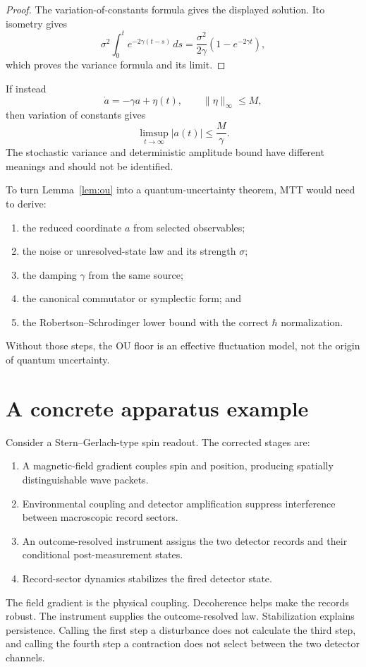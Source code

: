 \documentclass[11pt,a4paper]{article}
\theoremstyle{definition}
\theoremstyle{remark}
\begin{document}
\begin{proof}
The variation-of-constants formula gives the displayed solution. Ito isometry
gives
\[
\sigma^2\int_0^t e^{-2\gamma(t-s)}\,ds
=\frac{\sigma^2}{2\gamma}(1-e^{-2\gamma t}),
\]
which proves the variance formula and its limit.
\end{proof}

If instead
\[
\dot a=-\gamma a+\eta(t),
\qquad
\|\eta\|_\infty\leq M,
\]
then variation of constants gives
\[
\limsup_{t\to\infty}|a(t)|\leq\frac{M}{\gamma}.
\]
The stochastic variance and deterministic amplitude bound have different
meanings and should not be identified.

To turn Lemma~\ref{lem:ou} into a quantum-uncertainty theorem, MTT would need
to derive:
\begin{enumerate}
\item the reduced coordinate \(a\) from selected observables;
\item the noise or unresolved-state law and its strength \(\sigma\);
\item the damping \(\gamma\) from the same source;
\item the canonical commutator or symplectic form; and
\item the Robertson--Schrodinger lower bound with the correct \(\hbar\)
normalization.
\end{enumerate}
Without those steps, the OU floor is an effective fluctuation model, not the
origin of quantum uncertainty.

\section{A concrete apparatus example}

Consider a Stern--Gerlach-type spin readout. The corrected stages are:
\begin{enumerate}
\item A magnetic-field gradient couples spin and position, producing
spatially distinguishable wave packets.
\item Environmental coupling and detector amplification suppress
interference between macroscopic record sectors.
\item An outcome-resolved instrument assigns the two detector records and
their conditional post-measurement states.
\item Record-sector dynamics stabilizes the fired detector state.
\end{enumerate}

The field gradient is the physical coupling. Decoherence helps make the
records robust. The instrument supplies the outcome-resolved law.
Stabilization explains persistence. Calling the first step a disturbance does
not calculate the third step, and calling the fourth step a contraction does
not select between the two detector channels.
\end{document}
